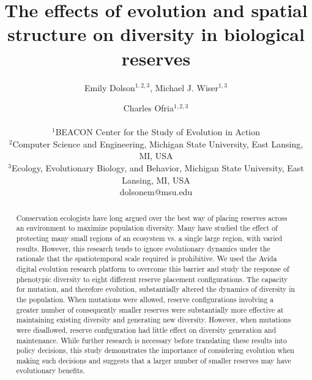 \documentclass[letterpaper]{article}
\title{The effects of evolution and spatial structure on  diversity in biological reserves}
\author{Emily Dolson$^{1,2,3}$, Michael J. Wiser$^{1,3}$ \and Charles Ofria$^{1,2,3}$ \\
\mbox{}\\
$^1$BEACON Center for the Study of Evolution in Action  \\
$^2$Computer Science and Engineering, Michigan State University, East Lansing, MI, USA \\
$^3$Ecology, Evolutionary Biology, and Behavior, Michigan State University, East Lansing, MI, USA\\
dolsonem@msu.edu}
\begin{document}
\maketitle
\begin{abstract}
Conservation ecologists have long argued over the best way of placing reserves across an environment to maximize population diversity. Many have studied the effect of protecting many small regions of an ecosystem vs. a single large region, with varied results.
However, this research tends to ignore evolutionary dynamics under the rationale that the spatiotemporal scale required is prohibitive.
We used the Avida digital evolution research platform to overcome this barrier and study the response of phenotypic diversity to eight different reserve placement configurations. The capacity for mutation, and therefore evolution, substantially altered the dynamics of diversity in the population. When mutations were allowed, reserve configurations involving a greater number of consequently smaller reserves were substantially more effective at maintaining existing diversity and generating new diversity. However, when mutations were disallowed, reserve configuration had little effect on diversity generation and maintenance. While further research is necessary before translating these results into policy decisions, this study demonstrates the importance of considering evolution when making such decisions and suggests that a larger number of smaller reserves may have evolutionary benefits.
%
%
%
%
%
%
%
%
%

\end{abstract}
\end{document}
